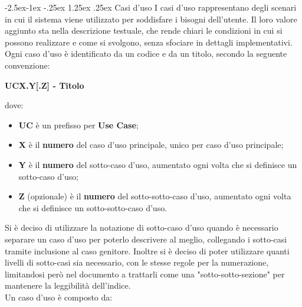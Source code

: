 \documentclass[a4paper,12pt]{article}
\makeatletter
\renewcommand\paragraph{\@startsection{paragraph}{4}{\z@}%
            {-2.5ex\@plus -1ex \@minus -.25ex}%
            {1.25ex \@plus .25ex}%
            {\normalfont\normalsize\bfseries}}
\makeatother
\begin{document}
            \paragraph{Casi d'uso}
                I casi d'uso rappresentano degli scenari in cui il sistema viene utilizzato per soddisfare i bisogni dell'utente.
                Il loro valore aggiunto sta nella descrizione testuale, che rende chiari le condizioni in cui si possono realizzare e come si svolgono, senza sfociare in dettagli implementativi.\\
                Ogni caso d'uso è identificato da un codice e da un titolo, secondo la seguente convenzione:
                \begin{center}
                    \textbf{UCX.Y[.Z] - Titolo}
                \end{center}
                dove:
                \begin{itemize}
                    \item \textbf{UC} è un prefisso per \textbf{Use Case};
                    \item \textbf{X} è il \textbf{numero} del caso d'uso principale, unico per caso d'uso principale;
                    \item \textbf{Y} è il \textbf{numero} del sotto-caso d'uso, aumentato ogni volta che si definisce un sotto-caso d'uso;
                    \item \textbf{Z} (opzionale) è il \textbf{numero} del sotto-sotto-caso d'uso, aumentato ogni volta che si definisce un sotto-sotto-caso d'uso.
                \end{itemize}
                Si è deciso di utilizzare la notazione di sotto-caso d'uso quando è necessario separare un caso d'uso per poterlo descrivere al meglio, collegando i sotto-casi tramite inclusione al caso genitore.
                Inoltre si è deciso di poter utilizzare quanti livelli di sotto-casi sia necessario, con le stesse regole per la numerazione, limitandosi però nel documento a trattarli come una "sotto-sotto-sezione" per mantenere la leggibilità dell'indice.\\
                Un caso d'uso è composto da:
\end{document}
